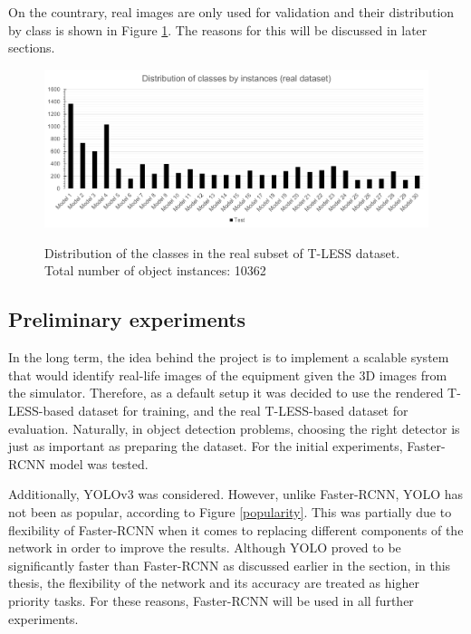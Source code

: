 \documentclass[english, 12pt, a4paper, elec, utf8, a-1b, online]{aaltothesis}
\begin{document}
On the countrary, real images are only used for validation and their distribution by class is shown in Figure \ref{tless_distribution}. The reasons for this will be discussed in later sections. 

\begin{figure}[htb]
	\begin{center}
		\includegraphics[width=14cm]{./real_distribution.png}
	\end{center}
	\caption{Distribution of the classes in the real subset of T-LESS dataset. Total number of object instances: 10362}
	\begin{center}
		\label{tless_distribution}
	\end{center}
\end{figure}
\FloatBarrier

\subsection{Preliminary experiments}
In the long term, the idea behind the project is to implement a scalable system that would identify real-life images of the equipment given the 3D images from the simulator. Therefore, as a default setup it was decided to use the rendered T-LESS-based dataset for training, and the real T-LESS-based dataset for evaluation. Naturally, in object detection problems, choosing the right detector is just as important as preparing the dataset. For the initial experiments, Faster-RCNN \cite{Girshick2015} model was tested.

Additionally, YOLOv3 \cite{Redmon2018a} was considered. However, unlike Faster-RCNN, YOLO has not been as popular, according to Figure \ref{popularity}. This was partially due to flexibility of Faster-RCNN when it comes to replacing different components of the network in order to improve the results. Although YOLO proved to be significantly faster than Faster-RCNN as discussed earlier in the  section, in this thesis, the flexibility of the network and its accuracy are treated  as higher priority tasks. For these reasons, Faster-RCNN will be used in all further experiments.  
   
\end{document}
